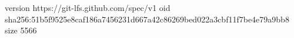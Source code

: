 version https://git-lfs.github.com/spec/v1
oid sha256:51b5f9525e8caf186a7456231d667a42c86269bed022a3cbf11f7be4e79a9bb8
size 5566
